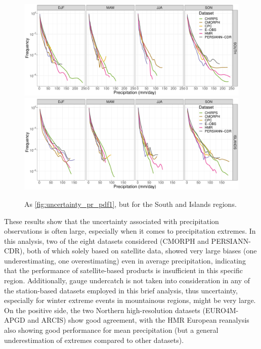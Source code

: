 \afterpage{\clearpage}
\begin{figure}
    \centering
        \includegraphics[width=0.8\textheight]{figures/uncertainty/pdf_SOUTH_lines}
        \includegraphics[width=0.8\textheight]{figures/uncertainty/pdf_ISLANDS_lines}
    \decoRule
    \caption[Precipitation distribution (PDFs): uncertainty over Italy (2)]{
        As \cref{fig:uncertainty_pr_pdf1}, but for the South and Islands regions.
    }\label{fig:uncertainty_pr_pdf2}
\end{figure}

These results show that the uncertainty associated with precipitation observations is often large, especially when it comes to precipitation extremes. In this analysis, two of the eight datasets considered (CMORPH and PERSIANN-CDR), both of which solely based on satellite data, showed very large biases (one underestimating, one overestimating) even in average precipitation, indicating that the performance of satellite-based products is insufficient in this specific region. Additionally, gauge undercatch is not taken into consideration in any of the station-based datasets employed in this brief analysis, thus uncertainty, especially for winter extreme events in mountainous regions, might be very large. On the positive side, the two Northern high-resolution datasets (EURO4M-APGD and ARCIS) show good agreement, with the HMR European reanalysis also showing good performance for mean precipitation (but a general underestimation of extremes compared to other datasets).


